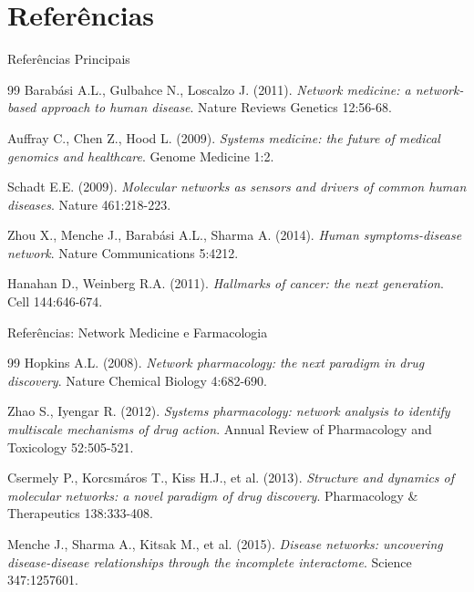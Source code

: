 \section{Referências}

\begin{frame}{Referências Principais}
\begin{thebibliography}{99}
 Barabási A.L., Gulbahce N., Loscalzo J. (2011). \textit{Network medicine: a network-based approach to human disease}. Nature Reviews Genetics 12:56-68.

 Auffray C., Chen Z., Hood L. (2009). \textit{Systems medicine: the future of medical genomics and healthcare}. Genome Medicine 1:2.

 Schadt E.E. (2009). \textit{Molecular networks as sensors and drivers of common human diseases}. Nature 461:218-223.

 Zhou X., Menche J., Barabási A.L., Sharma A. (2014). \textit{Human symptoms-disease network}. Nature Communications 5:4212.

 Hanahan D., Weinberg R.A. (2011). \textit{Hallmarks of cancer: the next generation}. Cell 144:646-674.
\end{thebibliography}
\end{frame}

\begin{frame}{Referências: Network Medicine e Farmacologia}
\begin{thebibliography}{99}
 Hopkins A.L. (2008). \textit{Network pharmacology: the next paradigm in drug discovery}. Nature Chemical Biology 4:682-690.

 Zhao S., Iyengar R. (2012). \textit{Systems pharmacology: network analysis to identify multiscale mechanisms of drug action}. Annual Review of Pharmacology and Toxicology 52:505-521.

 Csermely P., Korcsmáros T., Kiss H.J., et al. (2013). \textit{Structure and dynamics of molecular networks: a novel paradigm of drug discovery}. Pharmacology \& Therapeutics 138:333-408.

 Menche J., Sharma A., Kitsak M., et al. (2015). \textit{Disease networks: uncovering disease-disease relationships through the incomplete interactome}. Science 347:1257601.
\end{thebibliography}
\end{frame}


